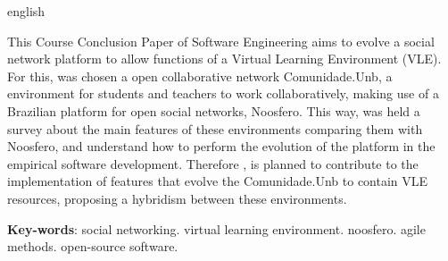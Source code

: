 \begin{resumo}[Abstract]
  \begin{otherlanguage*}{english}  

This Course Conclusion Paper of Software Engineering aims to evolve a social network platform to allow functions of a Virtual Learning Environment (VLE). For this, was chosen a open collaborative network Comunidade.Unb, a environment for students and teachers to work collaboratively, making use of a Brazilian platform  for open social networks, Noosfero. This way, was held a survey about the main features of these environments comparing them with Noosfero, and understand how to perform the evolution of the platform in the empirical software development. Therefore , is planned to contribute to the implementation of features that evolve the Comunidade.Unb to contain VLE resources, proposing a hybridism between these environments.

  \vspace{\onelineskip}
 
  \noindent 
  \textbf{Key-words}: social networking. virtual learning environment. noosfero. agile methods. open-source software.
  \end{otherlanguage*}
\end{resumo}

